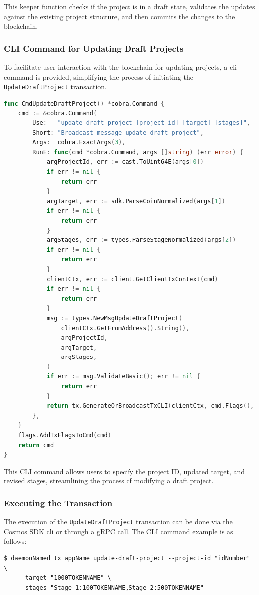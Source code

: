 This keeper function checks if the project is in a draft state, validates the updates against the existing project structure, and then commits the changes to the blockchain.

\subsubsection{CLI Command for Updating Draft Projects}

To facilitate user interaction with the blockchain for updating projects, a \gls{cli} command is provided, simplifying the process of initiating the \texttt{UpdateDraftProject} transaction.

\newpage
\begin{lstlisting}[language=go, caption=Create Project CLI definition, label={lst:update-draft-cli}]
func CmdUpdateDraftProject() *cobra.Command {
	cmd := &cobra.Command{
		Use:   "update-draft-project [project-id] [target] [stages]",
		Short: "Broadcast message update-draft-project",
		Args:  cobra.ExactArgs(3),
		RunE: func(cmd *cobra.Command, args []string) (err error) {
			argProjectId, err := cast.ToUint64E(args[0])
			if err != nil {
				return err
			}
			argTarget, err := sdk.ParseCoinNormalized(args[1])
			if err != nil {
				return err
			}
			argStages, err := types.ParseStageNormalized(args[2])
			if err != nil {
				return err
			}
			clientCtx, err := client.GetClientTxContext(cmd)
			if err != nil {
				return err
			}
			msg := types.NewMsgUpdateDraftProject(
				clientCtx.GetFromAddress().String(),
				argProjectId,
				argTarget,
				argStages,
			)
			if err := msg.ValidateBasic(); err != nil {
				return err
			}
			return tx.GenerateOrBroadcastTxCLI(clientCtx, cmd.Flags(), msg)
		},
	}
	flags.AddTxFlagsToCmd(cmd)
	return cmd
}
\end{lstlisting}

This CLI command allows users to specify the project ID, updated target, and revised stages, streamlining the process of modifying a draft project.

\subsubsection{Executing the Transaction}

The execution of the \texttt{UpdateDraftProject} transaction can be done via the Cosmos SDK \gls{cli} or through a gRPC call. The CLI command example is as follows:

\begin{verbatim}
$ daemonNamed tx appName update-draft-project --project-id "idNumber" \
    --target "1000TOKENNAME" \
    --stages "Stage 1:100TOKENNAME,Stage 2:500TOKENNAME"
\end{verbatim}

